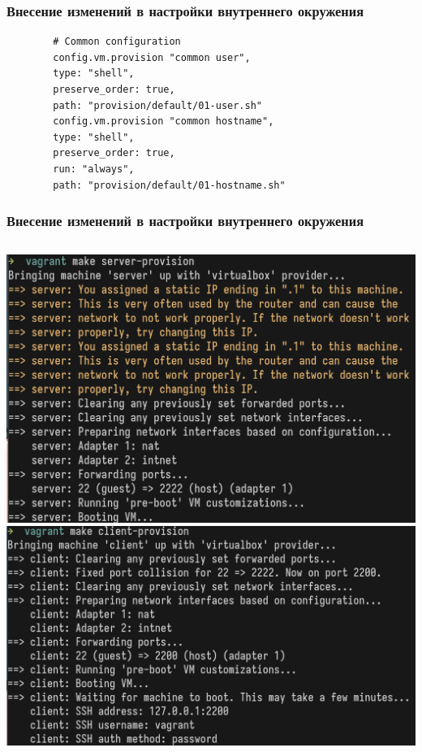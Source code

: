 \begin{frame}[containsverbatim]
\frametitle{Внесение изменений в настройки внутреннего окружения}
        \begin{verbatim}
        # Common configuration
        config.vm.provision "common user",
        type: "shell",
        preserve_order: true,
        path: "provision/default/01-user.sh"
        config.vm.provision "common hostname",
        type: "shell",
        preserve_order: true,
        run: "always",
        path: "provision/default/01-hostname.sh"
        \end{verbatim}
\end{frame}

\begin{frame}
\frametitle{Внесение изменений в настройки внутреннего окружения}
\begin{columns}
        \centering
        \includegraphics[width=\textwidth]{../images/img11.png}
        \centering
        \includegraphics[width=\textwidth]{../images/img12.png}
\end{columns}
\end{frame}



